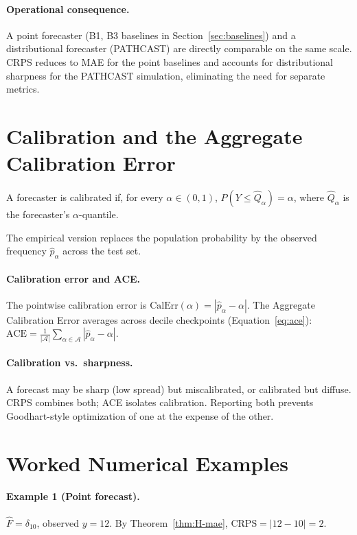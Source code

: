 \paragraph{Operational consequence.} A point forecaster (B1, B3 baselines
in Section~\ref{sec:baselines}) and a distributional forecaster
(PATHCAST) are directly comparable on the same scale. CRPS reduces to MAE
for the point baselines and accounts for distributional sharpness for the
PATHCAST simulation, eliminating the need for separate metrics.


\section{Calibration and the Aggregate Calibration Error}
\label{app:B-calibration}

\begin{definition}[Calibration]
A forecaster is calibrated if, for every $\alpha \in (0, 1)$,
$P(Y \leq \hat{Q}_\alpha) = \alpha$, where $\hat{Q}_\alpha$ is the
forecaster's $\alpha$-quantile.
\end{definition}

The empirical version replaces the population probability by the observed
frequency $\hat{p}_\alpha$ across the test set.

\paragraph{Calibration error and ACE.} The pointwise calibration error
is $\mathrm{CalErr}(\alpha) = |\hat{p}_\alpha - \alpha|$. The Aggregate
Calibration Error averages across decile checkpoints
(Equation~\ref{eq:ace}):
$\mathrm{ACE} = \frac{1}{|\mathcal{A}|} \sum_{\alpha \in \mathcal{A}}
|\hat{p}_\alpha - \alpha|$.

\paragraph{Calibration vs.\ sharpness.} A forecast may be sharp (low
spread) but miscalibrated, or calibrated but diffuse. CRPS combines both;
ACE isolates calibration. Reporting both prevents Goodhart-style
optimization of one at the expense of the other.


\section{Worked Numerical Examples}
\label{app:B-examples}

\paragraph{Example 1 (Point forecast).} $\hat{F} = \delta_{10}$, observed
$y = 12$. By Theorem~\ref{thm:H-mae}, $\mathrm{CRPS} = |12 - 10| = 2$.

